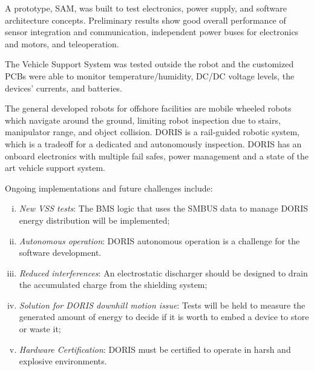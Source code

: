 \documentclass{ifacconf}
\begin{document}

A prototype, SAM, was built to test electronics, power supply, and software architecture concepts.
Preliminary results show good overall performance of sensor integration and
communication, independent power buses for electronics and motors, and
teleoperation.

The Vehicle Support System was tested outside the robot and the customized
PCBs were able to monitor temperature/humidity, DC/DC
voltage levels, the devices' currents, and batteries.

The general developed robots for offshore facilities are mobile wheeled robots
which navigate around the ground, limiting robot inspection due to stairs,
manipulator range, and object collision. DORIS is a rail-guided robotic system,
which is a tradeoff for a dedicated and autonomously inspection. DORIS has
an onboard electronics with multiple fail safes, power management and a
state of the art vehicle support system.

Ongoing implementations and future challenges include:
\begin{enumerate}[i)]
 
  \item \emph{New VSS tests}:
  The BMS logic that uses the SMBUS data to manage DORIS energy distribution
  will be implemented;
  \item \emph{Autonomous operation}:
  DORIS autonomous operation is a challenge for the software development. 
  \item \emph{Reduced interferences}:
  An electrostatic discharger should be designed to drain the accumulated
  charge from the shielding system;
  \item \emph{Solution for DORIS downhill motion issue}: Tests will be held to measure the generated amount of energy to decide
  if it is worth to embed a device to store or waste it;
  \item \emph{Hardware Certification}: 
  DORIS must be certified to operate in harsh and explosive environments.
\end{enumerate}



\appendix
\end{document}
